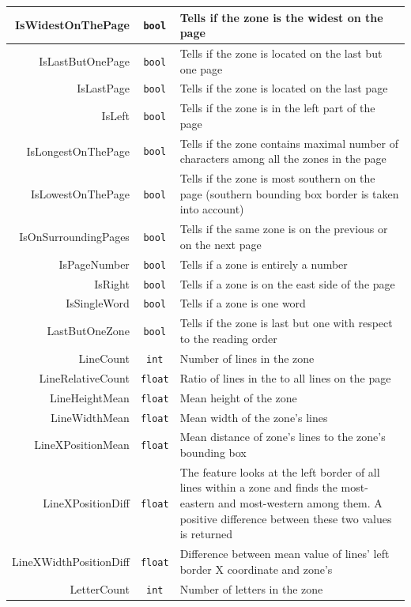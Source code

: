 \begin{appendix}
\begin{longtable}[c]{|r|c|p{8cm}|}
IsWidestOnThePage & \verb+bool+ & Tells if the zone is the widest on the page\\ \hline
IsLastButOnePage & \verb+bool+ & Tells if the zone is located on the last but one page\\ \hline
IsLastPage & \verb+bool+ & Tells if the zone is located on the last page\\ \hline
IsLeft & \verb+bool+ & Tells if the zone is in the left part of the page\\ \hline
IsLongestOnThePage & \verb+bool+ & Tells if the zone contains maximal number of characters among all the zones in the page\\ \hline
IsLowestOnThePage & \verb+bool+ & Tells if the zone is most southern on the page (southern bounding box border is taken into account) \\ \hline
IsOnSurroundingPages & \verb+bool+ & Tells if the same zone is on the previous or on the next page \\ \hline
IsPageNumber & \verb+bool+ & Tells if a zone is entirely a number \\ \hline
IsRight & \verb+bool+ & Tells if a zone is on the east side of the page\\ \hline
IsSingleWord & \verb+bool+ & Tells if a zone is one word \\ \hline
LastButOneZone & \verb+bool+ & Tells if the zone is last but one with respect to the reading order \\ \hline
LineCount & \verb+int+ & Number of lines in the zone\\ \hline
LineRelativeCount & \verb+float+ & Ratio of lines in the to all lines on the page\\ \hline
LineHeightMean & \verb+float+ & Mean height of the zone\\ \hline
LineWidthMean & \verb+float+ & Mean width of the zone's lines\\ \hline
LineXPositionMean & \verb+float+ & Mean distance of zone's lines to the zone's bounding box \\ \hline
LineXPositionDiff & \verb+float+ & The feature looks at the left border of all lines within a zone and finds the most-eastern and most-western among them. A positive difference between these two values is returned\\ \hline
LineXWidthPositionDiff & \verb+float+ & Difference between mean value of lines' left border X coordinate and zone's  \\ \hline
LetterCount & \verb+int+ & Number of letters in the zone\\ \hline

\end{longtable}
\end{appendix}

